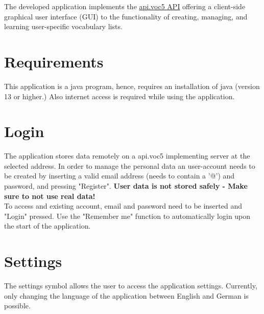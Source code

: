 

The developed application implements the \href{https://api.voc5.org/}{api.voc5 API} offering a client-side graphical user interface (GUI) to the functionality of creating, managing, and learning user-specific vocabulary lists. 

    \section{Requirements}
    This application is a java program, hence, requires an installation of java (version 13 or higher.) Also internet access is required while using the application. 

    \section{Login}
    The application stores data remotely on a api.voc5 implementing server at the selected address. In order to manage the personal data an user-account needs to be created by inserting a valid email address (needs to contain a '@') and password, and pressing "Register". \textbf{User data is not stored safely - Make sure to not use real data!} \\
    To access and existing account, email and password need to be inserted and "Login" pressed. Use the "Remember me" function to automatically login upon the start of the application. 

    \section{Settings}
    The settings symbol allows the user to access the application settings. Currently, only changing the language of the application between English and German is possible. 
    
